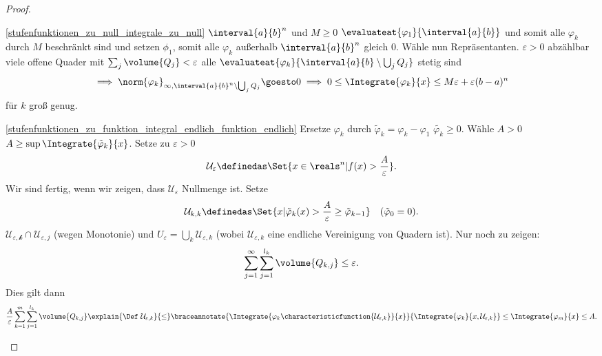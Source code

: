 \begin{proof}
  \begin{proofdescription}
    \item[\ref{stufenfunktionen_zu_null_integrale_zu_null}] \texists \( \interval{a}{b}^n \) und \texists \( M\geq 0 \) \sd \( \evaluateat{\varphi_1}{\interval{a}{b}} \) und somit alle \( \varphi_k \) durch \( M \) beschränkt sind und setzen \( \phi_1 \), somit alle \( \varphi_k \) außerhalb \( \interval{a}{b}^n \) gleich \( 0 \). Wähle nun Repräsentanten. \tforall  \( \varepsilon>0 \) \texists abzählbar viele offene Quader mit \( \sum_{j} \volume{Q_j}<\varepsilon \) \sd alle \( \evaluateat{\varphi_k}{\interval{a}{b}\setminus \bigcup_j Q_j} \) stetig sind 
    \begin{equation*}
      \implies \norm{\varphi_k}_{\infty,\interval{a}{b}^n\setminus \bigcup_j Q_j}\goesto 0\implies 0\leq \Integrate{\varphi_k}{x}\leq M\varepsilon+\varepsilon(b-a)^n
    \end{equation*}
    für \( k \) groß genug.
    \item[\ref{stufenfunktionen_zu_funktion_integral_endlich_funktion_endlich}] Ersetze \( \varphi_k\) durch \( \tilde{\varphi}_k=\varphi_k-\varphi_1 \) \timplies \( \tilde{\varphi_k}\geq 0 \). Wähle \( A>0 \) \sd \( A\geq \sup \Integrate{\tilde{\varphi}_k}{x} \). Setze zu \( \varepsilon>0 \)
    \begin{equation*}
        \mathcal{U}_{\varepsilon}\definedas \Set{x\in \reals^n|f(x)>\frac{A}{\varepsilon}}.
    \end{equation*}
    Wir sind fertig, wenn wir zeigen, dass \( \mathcal{U}_{\varepsilon} \) Nullmenge ist. Setze
    \begin{equation*}
      \mathcal{U}_{k,k}\definedas \Set{x|\tilde{\varphi}_k(x)>\frac{A}{\varepsilon}\geq \tilde{\varphi}_{k-1}}\quad (\tilde{\varphi}_0=0).
    \end{equation*}
    \timplies \( \mathcal{U_{\varepsilon,k}}\cap \mathcal{U}_{\varepsilon,j} \) (wegen Monotonie) und \( U_{\varepsilon}=\bigcup_k \mathcal{U}_{\varepsilon,k} \) (wobei \( \mathcal{U}_{\varepsilon,k} \) eine endliche Vereinigung von Quadern ist). Nur noch zu zeigen:
    \begin{equation*}
      \sum_{j=1}^{\infty}\sum_{j=1}^{l_k}\volume{Q_{k,j}}\leq \varepsilon.
    \end{equation*}
    Dies gilt dann
    \begin{equation*}
      \frac{A}{\varepsilon}\sum_{k=1}^{m}\sum_{j=1}^{l_k}\volume{Q_{k,j}}\explain{\text{\Def }\mathcal{U}_{\varepsilon,k}}{\leq}\braceannotate{\Integrate{\varphi_k \characteristicfunction{\mathcal{U}_{\varepsilon,k}}}{x}}{\Integrate{\varphi_k}{x,\mathcal{U}_{\varepsilon,k}}}\leq \Integrate{\varphi_m}{x}\leq A.
    \end{equation*}
  \end{proofdescription}
  
\end{proof}
